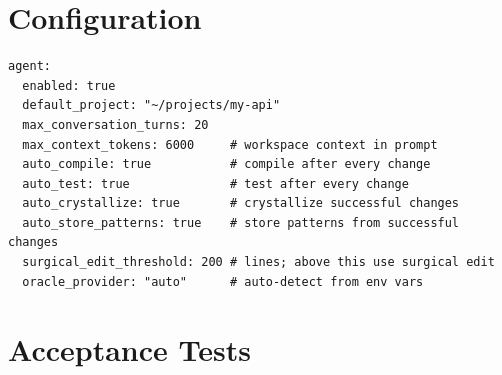 \documentclass[11pt,a4paper,twoside]{article}
\theoremstyle{definition}
\theoremstyle{remark}
\begin{document}
\part{Configuration}\label{part:config}

\begin{lstlisting}
agent:
  enabled: true
  default_project: "~/projects/my-api"
  max_conversation_turns: 20
  max_context_tokens: 6000     # workspace context in prompt
  auto_compile: true           # compile after every change
  auto_test: true              # test after every change
  auto_crystallize: true       # crystallize successful changes
  auto_store_patterns: true    # store patterns from successful changes
  surgical_edit_threshold: 200 # lines; above this use surgical edit
  oracle_provider: "auto"      # auto-detect from env vars
\end{lstlisting}


\part{Acceptance Tests}\label{part:tests}
\end{document}
